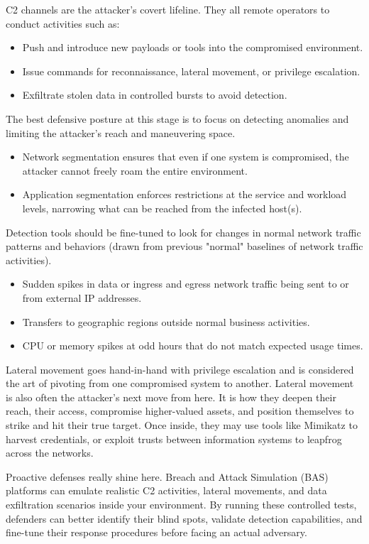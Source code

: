 C2 channels are the attacker's covert lifeline. They all remote operators to conduct activities such as:
\begin{itemize}
    \item Push and introduce new payloads or tools into the compromised environment.
    \item Issue commands for reconnaissance, lateral movement, or privilege escalation.
    \item Exfiltrate stolen data in controlled bursts to avoid detection.
\end{itemize}

The best defensive posture at this stage is to focus on detecting anomalies and limiting the attacker's reach and maneuvering space.
\begin{itemize}
    \item Network segmentation ensures that even if one system is compromised, the attacker cannot freely roam the entire environment.
    \item Application segmentation enforces restrictions at the service and workload levels, narrowing what can be reached from the infected host(s).
\end{itemize}

Detection tools should be fine-tuned to look for changes in normal network traffic patterns and behaviors (drawn from previous "normal" baselines of network traffic activities).
\begin{itemize}
    \item Sudden spikes in data or ingress and egress network traffic being sent to or from external IP addresses.
    \item Transfers to geographic regions outside normal business activities.
    \item CPU or memory spikes at odd hours that do not match expected usage times.
\end{itemize}

Lateral movement goes hand-in-hand with privilege escalation and is considered the art of pivoting from one compromised system to another. Lateral movement is also often the attacker's next move from here. It is how they deepen their reach, their access, compromise higher-valued assets, and position themselves to strike and hit their true target. Once inside, they may use tools like Mimikatz to harvest credentials, or exploit trusts between information systems to leapfrog across the networks.

Proactive defenses really shine here. Breach and Attack Simulation (BAS) platforms can emulate realistic C2 activities, lateral movements, and data exfiltration scenarios inside your environment. By running these controlled tests, defenders can better identify their blind spots, validate detection capabilities, and fine-tune their response procedures before facing an actual adversary.

